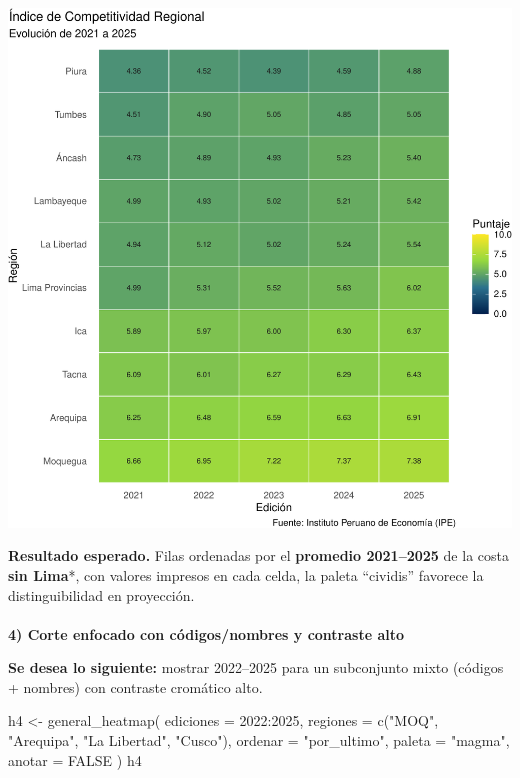 \documentclass[
  11pt,
  letterpaper,
  DIV=11,
  numbers=noendperiod]{scrartcl}
\makeatletter
\let\oldparagraph\paragraph
\renewcommand{\paragraph}{
    \@ifstar
      \xxxParagraphStar
      \xxxParagraphNoStar
  }
\newcommand{\xxxParagraphStar}[1]{\oldparagraph*{#1}\mbox{}}
\newcommand{\xxxParagraphNoStar}[1]{\oldparagraph{#1}\mbox{}}
\newenvironment{Shaded}{\begin{snugshade}}{\end{snugshade}}
\newcommand{\AttributeTok}[1]{\textcolor[rgb]{0.40,0.45,0.13}{#1}}
\newcommand{\ConstantTok}[1]{\textcolor[rgb]{0.56,0.35,0.01}{#1}}
\newcommand{\DecValTok}[1]{\textcolor[rgb]{0.68,0.00,0.00}{#1}}
\newcommand{\FunctionTok}[1]{\textcolor[rgb]{0.28,0.35,0.67}{#1}}
\newcommand{\NormalTok}[1]{\textcolor[rgb]{0.00,0.23,0.31}{#1}}
\newcommand{\OtherTok}[1]{\textcolor[rgb]{0.00,0.23,0.31}{#1}}
\newcommand{\SpecialCharTok}[1]{\textcolor[rgb]{0.37,0.37,0.37}{#1}}
\newcommand{\StringTok}[1]{\textcolor[rgb]{0.13,0.47,0.30}{#1}}
\makeatother
\begin{document}
\includegraphics{Manual_files/figure-pdf/unnamed-chunk-33-1.pdf}

\textbf{Resultado esperado.} Filas ordenadas por el \textbf{promedio
2021--2025} de la costa \textbf{sin Lima}*, con valores impresos en cada
celda, la paleta ``cividis'' favorece la distinguibilidad en proyección.

\paragraph{\texorpdfstring{\textbf{4) Corte enfocado con códigos/nombres
y contraste
alto}}{4) Corte enfocado con códigos/nombres y contraste alto}}\label{corte-enfocado-con-cuxf3digosnombres-y-contraste-alto}

\textbf{Se desea lo siguiente:} mostrar 2022--2025 para un subconjunto
mixto (códigos + nombres) con contraste cromático alto.

\begin{Shaded}
\begin{Highlighting}[]
\NormalTok{h4 }\OtherTok{\textless{}{-}} \FunctionTok{general\_heatmap}\NormalTok{(}
  \AttributeTok{ediciones =} \DecValTok{2022}\SpecialCharTok{:}\DecValTok{2025}\NormalTok{,}
  \AttributeTok{regiones  =} \FunctionTok{c}\NormalTok{(}\StringTok{"MOQ"}\NormalTok{, }\StringTok{"Arequipa"}\NormalTok{, }\StringTok{"La Libertad"}\NormalTok{, }\StringTok{"Cusco"}\NormalTok{),}
  \AttributeTok{ordenar   =} \StringTok{"por\_ultimo"}\NormalTok{,}
  \AttributeTok{paleta    =} \StringTok{"magma"}\NormalTok{,}
  \AttributeTok{anotar    =} \ConstantTok{FALSE}
\NormalTok{)}
\NormalTok{h4}
\end{Highlighting}
\end{Shaded}
\end{document}

